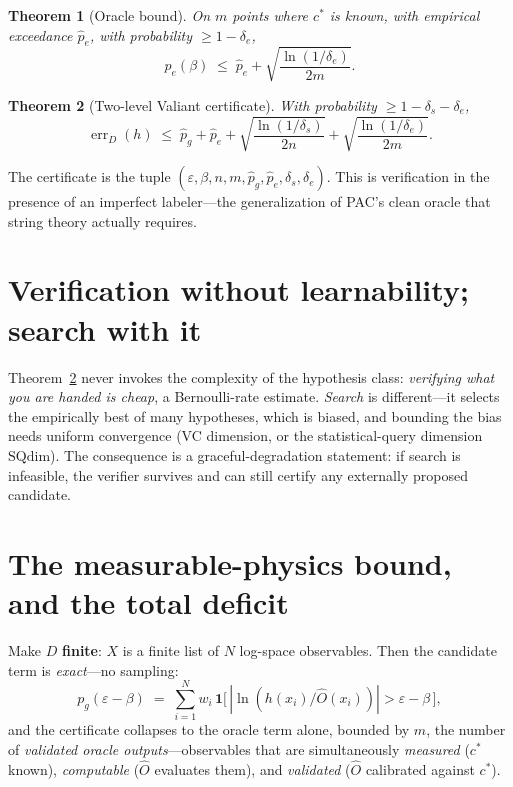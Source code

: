 \documentclass[11pt]{article}
\newtheorem{theorem}{Theorem}
\newcommand{\cstar}{c^{*}}
\newcommand{\oracle}{\widehat{O}}
\newcommand{\eps}{\varepsilon}
\begin{document}
\begin{theorem}[Oracle bound]
\label{thm:oracle}
On $m$ points where $\cstar$ is known, with empirical exceedance $\hat p_e$, with
probability $\ge 1-\delta_e$,
\[
p_e(\beta) \;\le\; \hat p_e + \sqrt{\frac{\ln(1/\delta_e)}{2m}} .
\]
\end{theorem}

\begin{theorem}[Two-level Valiant certificate]
\label{thm:twolevel}
With probability $\ge 1 - \delta_s - \delta_e$,
\[
\operatorname{err}_D(h) \;\le\;
\hat p_g + \hat p_e
+ \sqrt{\frac{\ln(1/\delta_s)}{2n}}
+ \sqrt{\frac{\ln(1/\delta_e)}{2m}} .
\]
\end{theorem}

The certificate is the tuple $(\eps, \beta, n, m, \hat p_g, \hat p_e, \delta_s,
\delta_e)$. This is verification in the presence of an imperfect labeler---the
generalization of PAC's clean oracle that string theory actually requires.

\section{Verification without learnability; search with it}
\label{sec:verify}

Theorem~\ref{thm:twolevel} never invokes the complexity of the hypothesis class:
\emph{verifying what you are handed is cheap}, a Bernoulli-rate estimate. \emph{Search}
is different---it selects the empirically best of many hypotheses, which is biased, and
bounding the bias needs uniform convergence (VC dimension, or the statistical-query
dimension $\mathrm{SQdim}$). The consequence is a graceful-degradation statement: if
search is infeasible, the verifier survives and can still certify any externally
proposed candidate.

\section{The measurable-physics bound, and the total deficit}
\label{sec:measure}

Make $D$ \textbf{finite}: $X$ is a finite list of $N$ log-space observables. Then the
candidate term is \emph{exact}---no sampling:
\[
p_g(\eps - \beta) \;=\;
\sum_{i=1}^{N} w_i \, \mathbf{1}\!\bigl[\, |\ln(h(x_i)/\oracle(x_i))| > \eps-\beta \,\bigr],
\]
and the certificate collapses to the oracle term alone, bounded by $m$, the number of
\emph{validated oracle outputs}---observables that are simultaneously \emph{measured}
($\cstar$ known), \emph{computable} ($\oracle$ evaluates them), and \emph{validated}
($\oracle$ calibrated against $\cstar$).
\end{document}

